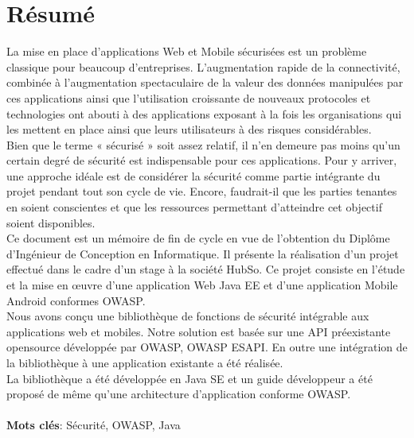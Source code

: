 
\chapter*{Résumé}

La mise en place d'applications Web et Mobile sécurisées est un problème classique pour beaucoup d'entreprises. L’augmentation rapide de la connectivité, combinée à l’augmentation spectaculaire de la valeur des données manipulées par ces applications ainsi que l’utilisation croissante de nouveaux protocoles et technologies ont abouti à des applications exposant à la fois les organisations qui les mettent en place ainsi que leurs utilisateurs à des risques considérables.\\
Bien que le terme « sécurisé » soit assez relatif, il n'en demeure pas moins qu'un certain degré de sécurité est indispensable pour ces applications. Pour y arriver, une approche idéale est de considérer la sécurité comme partie intégrante du projet pendant tout son cycle de vie. Encore, faudrait-il que les parties tenantes en soient conscientes et que les ressources permettant d'atteindre cet objectif soient disponibles.\\
Ce document est un mémoire de fin de cycle en vue de l’obtention du Diplôme d’Ingénieur de Conception en Informatique. Il présente la réalisation d’un projet effectué dans le cadre d’un stage à la société HubSo. Ce projet consiste en l'étude et la mise en œuvre d'une application Web Java EE et d'une application Mobile Android conformes OWASP.\\
Nous avons conçu une bibliothèque de fonctions de sécurité intégrable aux applications web et mobiles. Notre solution est basée sur une API préexistante opensource développée par OWASP, OWASP ESAPI. En outre une intégration de la bibliothèque à une application existante a été réalisée.\\
La bibliothèque a été développée en Java SE et un guide développeur a été proposé de même qu'une architecture d'application conforme OWASP.\\ \\
\textbf{Mots clés}: Sécurité, OWASP, Java



\clearpage
